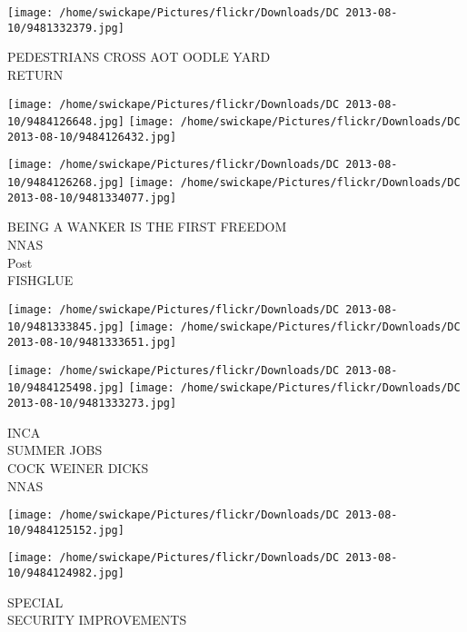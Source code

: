 \documentclass[10pt,letterpaper]{article}
\begin{document}
\vspace{0.25in}
\texttt{[image: /home/swickape/Pictures/flickr/Downloads/DC 2013-08-10/9481332379.jpg]}

PEDESTRIANS CROSS AOT OODLE YARD\\
RETURN
\pagebreak

\texttt{[image: /home/swickape/Pictures/flickr/Downloads/DC 2013-08-10/9484126648.jpg]}
\texttt{[image: /home/swickape/Pictures/flickr/Downloads/DC 2013-08-10/9484126432.jpg]}

\texttt{[image: /home/swickape/Pictures/flickr/Downloads/DC 2013-08-10/9484126268.jpg]}
\texttt{[image: /home/swickape/Pictures/flickr/Downloads/DC 2013-08-10/9481334077.jpg]}

BEING A WANKER IS THE FIRST FREEDOM\\
NNAS\\
Post\\
FISHGLUE
\pagebreak

\texttt{[image: /home/swickape/Pictures/flickr/Downloads/DC 2013-08-10/9481333845.jpg]}
\texttt{[image: /home/swickape/Pictures/flickr/Downloads/DC 2013-08-10/9481333651.jpg]}

\texttt{[image: /home/swickape/Pictures/flickr/Downloads/DC 2013-08-10/9484125498.jpg]}
\texttt{[image: /home/swickape/Pictures/flickr/Downloads/DC 2013-08-10/9481333273.jpg]}

INCA\\
SUMMER JOBS\\
COCK WEINER DICKS\\
NNAS
\pagebreak

\texttt{[image: /home/swickape/Pictures/flickr/Downloads/DC 2013-08-10/9484125152.jpg]}

\vspace{0.25in}
\texttt{[image: /home/swickape/Pictures/flickr/Downloads/DC 2013-08-10/9484124982.jpg]}

SPECIAL\\
SECURITY IMPROVEMENTS
\pagebreak
\end{document}
